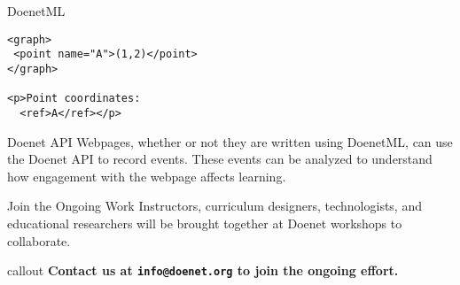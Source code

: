 \vspace{-2ex}
\vspace{1ex}


\begin{sectionblock}{DoenetML}
\begin{verbatim}
<graph>
 <point name="A">(1,2)</point>
</graph>

<p>Point coordinates:
  <ref>A</ref></p> 
\end{verbatim}
\end{sectionblock}

\vspace{1ex}

\begin{sectionblock}{Doenet API}
  Webpages, whether or not they are written using DoenetML, can use
  the Doenet API to record events.  These events can be analyzed to
  understand how engagement with the webpage affects learning.
  
\end{sectionblock}

\vspace{1ex}

\begin{sectionblock}{Join the Ongoing Work}
  Instructors, curriculum designers, technologists, and educational
  researchers will be brought together at Doenet workshops to
  collaborate.

  \vspace{1ex}
  \begin{beamercolorbox}[sep=0.5em]{callout}
    \vspace{1ex}\textbf{Contact us at \texttt{info@doenet.org} to join the
      ongoing effort.}
  \end{beamercolorbox}
\end{sectionblock}


